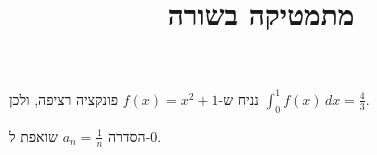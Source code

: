 \documentclass[11pt,a4paper]{article}
\title{מתמטיקה בשורה}
\date{}
\begin{document}
\maketitle

נניח ש-$f(x) = x^2 + 1$ פונקציה רציפה, ולכן $\int_0^1 f(x)\,dx = \frac{4}{3}$.

הסדרה $a_n = \frac{1}{n}$ שואפת ל-$0$.
\end{document}
